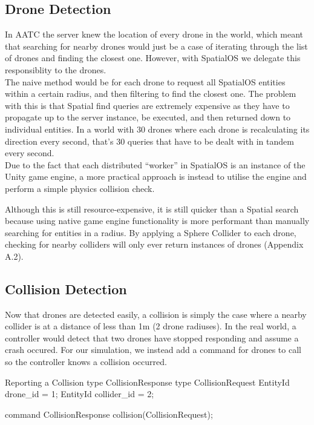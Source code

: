 \documentclass[a4paper,11pt,titlepage]{report}
\begin{document}
\subsection{Drone Detection}
In AATC the server knew the location of every drone in the world, which meant that searching for nearby drones would just be a case of iterating through the list of drones and finding the closest one. However, with SpatialOS we delegate this responsiblity to the drones.\\

The naive method would be for each drone to request all SpatialOS entities within a certain radius, and then filtering to find the closest one. The problem with this is that Spatial find queries are extremely expensive as they have to propagate up to the server instance, be executed, and then returned down to individual entities. In a world with 30 drones where each drone is recalculating its direction every second, that's 30 queries that have to be dealt with in tandem every second.\\

Due to the fact that each distributed ``worker'' in SpatialOS is an instance of the Unity game engine, a more practical approach is instead to utilise the engine and perform a simple physics collision check.

\clearpage
Although this is still resource-expensive, it is still quicker than a Spatial search because using native game engine functionality is more performant than manually searching for entities in a radius. By applying a Sphere Collider to each drone, checking for nearby colliders will only ever return instances of drones (Appendix A.2).

\subsection{Collision Detection}
Now that drones are detected easily, a collision is simply the case where a nearby collider is at a distance of less than 1m (2 drone radiuses). In the real world, a controller would detect that two drones have stopped responding and assume a crash occured. For our simulation, we instead add a command for drones to call so the controller knows a collision occurred. \\

\begin{sexylisting}[colback=white]{Reporting a Collision}
type CollisionResponse {}
type CollisionRequest {
  EntityId drone_id = 1;
  EntityId collider_id = 2;
}

command CollisionResponse collision(CollisionRequest);
\end{sexylisting}
\end{document}
